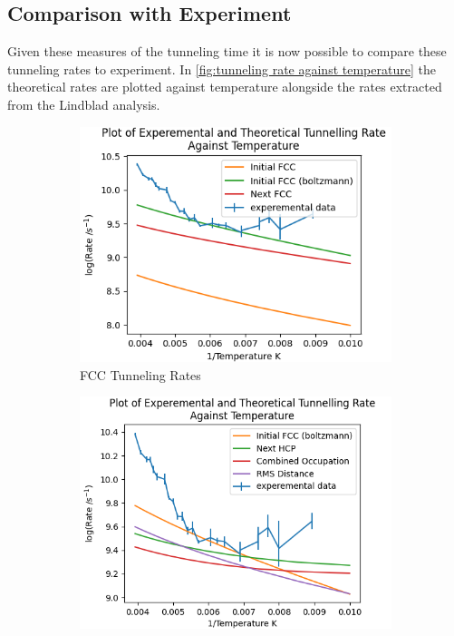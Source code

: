 \subsection{Comparison with Experiment}
Given these measures of the
tunneling time it is now possible to compare
these tunneling rates to experiment.
In \cref{fig:tunneling rate against temperature}
the theoretical rates
are plotted against temperature
alongside the rates extracted
from the Lindblad analysis.
\begin{figure}[htbp]
    \captionsetup[subfigure]{justification=centering}
    \centering
    \begin{subfigure}{0.3\linewidth}
        \centering
        \includegraphics[width =0.9 \linewidth]{Figures/Redfield/Plot of redfield temperature dependance FCC points.png}
        \caption{FCC Tunneling Rates
        }\label{sub@fig:fcc tunneling rates temp dependence}
    \end{subfigure}
    \hfill
    \begin{subfigure}{0.3\linewidth}
        \centering
        \includegraphics[width = 0.9\linewidth]{Figures/Redfield/Plot of redfield temperature dependance close points.png}

\end{subfigure}
\end{figure}
